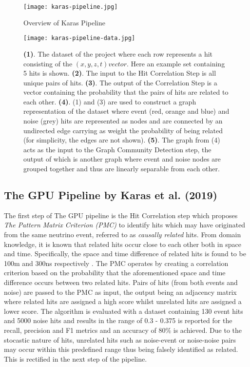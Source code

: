 \begin{figure}[h]
  \centering
  \texttt{[image: karas-pipeline.jpg]}
  \caption{Overview of Karas Pipeline}
  \label{fig:karas-pipeline}
\end{figure}

\begin{figure}[h]
  \centering
  \texttt{[image: karas-pipeline-data.jpg]}
  \caption{\textbf{(1)}. The dataset of the project where each row
    represents a hit consisting of the $(x, y, z, t) vector$. Here an
    example set containing 5 hits is shown. \textbf{(2)}. The input to
    the Hit Correlation Step is all unique pairs of hits.
    \textbf{(3)}. The output of the Correlation Step is a vector
    containing the probability that the pairs of hits are related to
    each other. \textbf{(4)}. (1) and (3) are used to construct a
    graph representation of the dataset where event (red, orange and
    blue) and noise (grey) hits are represented as nodes and are
    connected by an undirected edge carrying as weight the probability
    of being related (for simplicity, the edges are not shown).
    \textbf{(5)}. The graph from (4) acts as the input to the Graph
    Community Detection step, the output of which is another graph
    where event and noise nodes are grouped together and thus are
    linearly separable from each other.}
  \label{fig:karas-pipeline-data}
\end{figure}

\subsection{The GPU Pipeline by Karas et al. (2019)}
\label{sec:gpu-pipeline}
The first step of The GPU pipeline is the Hit Correlation step which
proposes \emph{The Pattern Matrix Criterion (PMC)} to identify hits
which may have originated from the same neutrino event, referred to as
\emph{causally related} hits. From domain knowledge, it is known that
related hits occur close to each other both in space and time.
Specifically, the space and time difference of related hits is found
to be 100m and 300ns respectively \cite{adrian2016letter}. The PMC
operates by creating a correlation criterion based on the probability
that the aforementioned space and time difference occurs between two
related hits. Pairs of hits (from both events and noise) are passed to
the PMC as input, the output being an adjacency matrix where related
hits are assigned a high score whilst unrelated hits are assigned a
lower score. The algorithm is evaluated with a dataset containing 130
event hits and 5000 noise hits and results in the range of 0.3 - 0.375
is reported for the recall, precision and F1 metrics and an accuracy
of 80\% is achieved. Due to the stocastic nature of hits, unrelated
hits such as noise-event or noise-noise pairs may occur within this
predefined range thus being falsely identified as related. This is
rectified in the next step of the pipeline.

